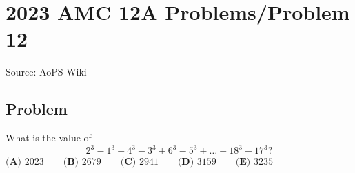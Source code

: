 \documentclass[12pt]{article}
\begin{document}
\section*{{2023 AMC 12A Problems/Problem 12}}
Source: AoPS Wiki

\subsection*{Problem}
What is the value of \[2^3 - 1^3 + 4^3 - 3^3 + 6^3 - 5^3 + \dots + 18^3 - 17^3?\] $\textbf{(A) } 2023 \qquad\textbf{(B) } 2679 \qquad\textbf{(C) } 2941 \qquad\textbf{(D) } 3159 \qquad\textbf{(E) } 3235$
\end{document}
